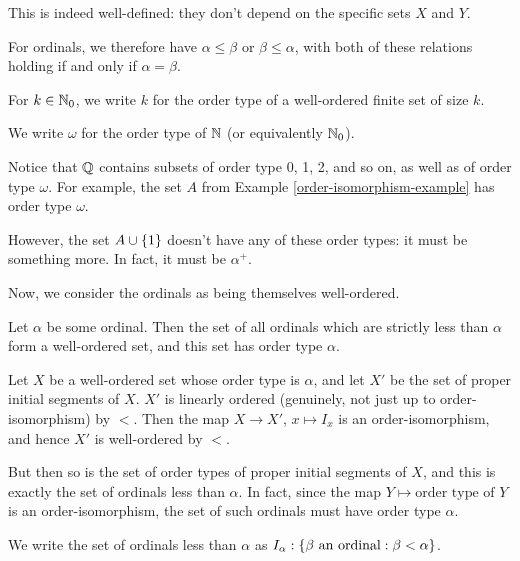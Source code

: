 \documentclass{article}
\begin{document}
\begin{note}
	This is indeed well-defined: they don't depend on the specific sets $X$ and $Y$.
\end{note}

\begin{corollary}
    For ordinals, we therefore have $\alpha \leq \beta$ or $\beta \leq \alpha$, with both of these relations holding if and only if $\alpha = \beta$.
\end{corollary}

\begin{example}
    For $k \in \mathbb{N}_0$, we write $k$ for the order type of a well-ordered finite set of size $k$.
    
    We write $\omega$ for the order type of $\mathbb{N}$ (or equivalently $\mathbb{N}_0$).
    
    Notice that $\mathbb{Q}$ contains subsets of order type 0, 1, 2, and so on, as well as of order type $\omega$. For example, the set $A$ from Example \ref{order-isomorphism-example} has order type $\omega$.
    
    However, the set $A \cup \left\lbrace 1 \right\rbrace$ doesn't have any of these order types: it must be something more. In fact, it must be $\alpha^+$.
\end{example}

Now, we consider the ordinals as being themselves well-ordered.

\begin{proposition}
    Let $\alpha$ be some ordinal. Then the set of all ordinals which are strictly less than $\alpha$ form a well-ordered set, and this set has order type $\alpha$.
\end{proposition}

\begin{prf}
    Let $X$ be a well-ordered set whose order type is $\alpha$, and let $X'$ be the set of proper initial segments of $X$. $X'$ is linearly ordered (genuinely, not just up to order-isomorphism) by $<$. Then the map $X \to X'$, $x \mapsto I_x$ is an order-isomorphism, and hence $X'$ is well-ordered by $<$.
    
    But then so is the set of order types of proper initial segments of $X$, and this is exactly the set of ordinals less than $\alpha$. In fact, since the map $Y \mapsto \text{order type of } Y$ is an order-isomorphism, the set of such ordinals must have order type $\alpha$.
\end{prf}

\begin{note}
	We write the set of ordinals less than $\alpha$ as $I_\alpha: \left\lbrace \beta \text{ an ordinal} : \beta < \alpha \right\rbrace$.
\end{note}
\end{document}

